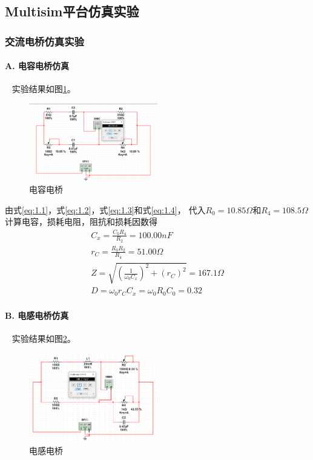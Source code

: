 \documentclass[10pt,a4paper,twocolumn,twoside,UTF8]{ctexart}
\begin{document}
	\subsection{Multisim平台仿真实验}
		\subsubsection{交流电桥仿真实验}
			\paragraph{A. 电容电桥仿真}~
			\newline 
			\indent
			实验结果如图\ref{fig:1.1}。
			\begin{figure}[htbp]
				\centering
				\includegraphics[width=0.5\textwidth]{attachments/fig.1.1.png}
				\caption{电容电桥}
				\label{fig:1.1}
			\end{figure}	
			由式\ref{eq:1.1}，式\ref{eq:1.2}，式\ref{eq:1.3}和式\ref{eq:1.4}，
			代入$R_0 = 10.85 \Omega$和$R_4 = 108.5 \Omega$计算电容，损耗电阻，阻抗和损耗因数得
				\begin{gather}
					C_x = \frac{C_0R_4}{R_2} = 100.00 nF  \\
					r_C = \frac{R_0R_2}{R_4} = 51.00 \Omega \\
					Z = \sqrt{(\frac{1}{\omega_0 C_x})^2+(r_C)^2} = 167.1 \Omega \\
					D = \omega_0r_CC_x = \omega_0R_0C_0 =  0.32 
				\end{gather}

			\paragraph{B. 电感电桥仿真}~
			\newline 
			\indent
			实验结果如图\ref{fig:1.2}。
			\begin{figure}[htbp]
				\centering
				\includegraphics[width=0.5\textwidth]{attachments/fig.1.2.png}
				\caption{电感电桥}
				\label{fig:1.2}
			\end{figure}
			
\end{document}

